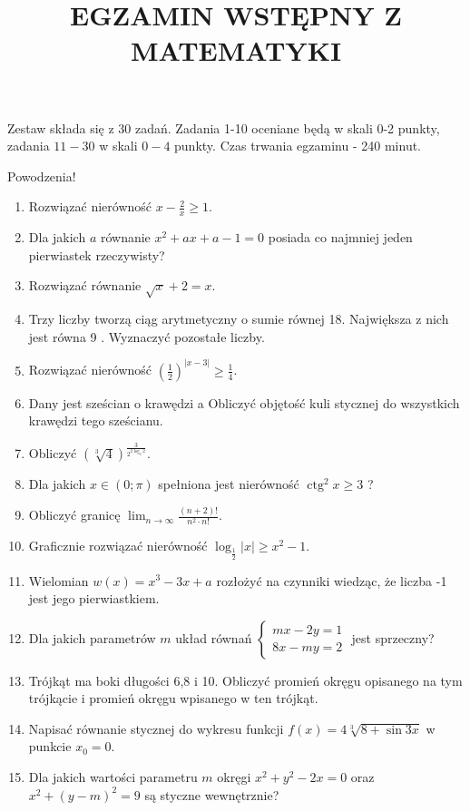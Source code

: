 \documentclass[10pt]{article}
\title{EGZAMIN WSTĘPNY Z MATEMATYKI }
\author{}
\date{}
\begin{document}
\maketitle
Zestaw składa się z 30 zadań. Zadania 1-10 oceniane będą w skali 0-2 punkty, zadania \(11-30\) w skali \(0-4\) punkty. Czas trwania egzaminu - 240 minut.

Powodzenia!

\begin{enumerate}
  \item Rozwiązać nierówność \(x-\frac{2}{x} \geqslant 1\).
  \item Dla jakich \(a\) równanie \(x^{2}+a x+a-1=0\) posiada co najmniej jeden pierwiastek rzeczywisty?
  \item Rozwiązać równanie \(\sqrt{x}+2=x\).
  \item Trzy liczby tworzą ciąg arytmetyczny o sumie równej 18. Największa z nich jest równa 9 . Wyznaczyć pozostałe liczby.
  \item Rozwiązać nierówność \(\left(\frac{1}{2}\right)^{|x-3|} \geqslant \frac{1}{4}\).
  \item Dany jest sześcian o krawędzi a Obliczyć objętość kuli stycznej do wszystkich krawędzi tego sześcianu.
  \item Obliczyć \((\sqrt[3]{4})^{\frac{3}{2^{2 \log _{3} 2}}}\).
  \item Dla jakich \(x \in(0 ; \pi)\) spełniona jest nierówność \(\operatorname{ctg}^{2} x \geqslant 3\) ?
  \item Obliczyć granicę \(\lim _{n \rightarrow \infty} \frac{(n+2)!}{n^{2} \cdot n!}\).
  \item Graficznie rozwiązać nierówność \(\log _{\frac{1}{2}}|x| \geqslant x^{2}-1\).
  \item Wielomian \(w(x)=x^{3}-3 x+a\) rozłożyć na czynniki wiedząc, że liczba -1 jest jego pierwiastkiem.
  \item Dla jakich parametrów \(m\) układ równań \(\left\{\begin{array}{r}m x-2 y=1 \\ 8 x-m y=2\end{array}\right.\) jest sprzeczny?
  \item Trójkąt ma boki długości 6,8 i 10. Obliczyć promień okręgu opisanego na tym trójkącie i promień okręgu wpisanego w ten trójkąt.
  \item Napisać równanie stycznej do wykresu funkcji \(f(x)=4 \sqrt[3]{8+\sin 3 x}\) w punkcie \(x_{0}=0\).
  \item Dla jakich wartości parametru \(m\) okręgi \(x^{2}+y^{2}-2 x=0\) oraz \(x^{2}+(y-m)^{2}=9\) są styczne wewnętrznie?

\end{enumerate}
\end{document}
